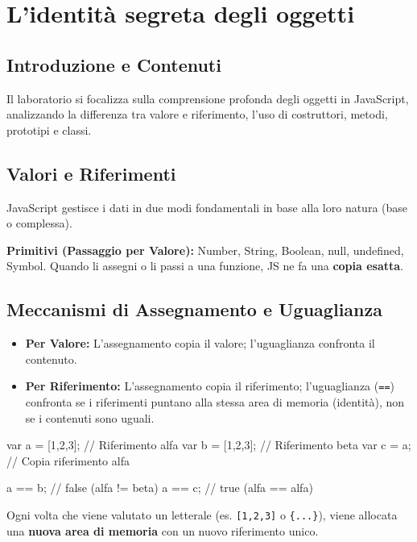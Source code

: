 \section{L'identità segreta degli oggetti}

\subsection{Introduzione e Contenuti}
Il laboratorio si focalizza sulla comprensione profonda degli oggetti in JavaScript, analizzando la differenza tra valore e riferimento, l'uso di costruttori, metodi, prototipi e classi.

\subsection{Valori e Riferimenti}
JavaScript gestisce i dati in due modi fondamentali in base alla loro natura (base o complessa).

\begin{definition}[title={Tipi di dato e Semantica}]
\textbf{Primitivi (Passaggio per Valore):} Number, String, Boolean, null, undefined, Symbol.
Quando li assegni o li passi a una funzione, JS ne fa una \textbf{copia esatta}.
\end{definition}

\subsection{Meccanismi di Assegnamento e Uguaglianza}
\begin{itemize}
    \item \textbf{Per Valore:} L'assegnamento copia il valore; l'uguaglianza confronta il contenuto.
    \item \textbf{Per Riferimento:} L'assegnamento copia il riferimento; l'uguaglianza (\texttt{==}) confronta se i riferimenti puntano alla stessa area di memoria (identità), non se i contenuti sono uguali.
\end{itemize}

\begin{jsbox}[title={Esempio Identità vs Uguaglianza}]
var a = [1,2,3]; // Riferimento alfa
var b = [1,2,3]; // Riferimento beta
var c = a;       // Copia riferimento alfa

a == b; // false (alfa != beta)
a == c; // true  (alfa == alfa)
\end{jsbox}

\begin{concept}[title={Allocazione di Memoria}]
Ogni volta che viene valutato un letterale (es. \texttt{[1,2,3]} o \texttt{\{...\}}), viene allocata una \textbf{nuova area di memoria} con un nuovo riferimento unico.
\end{concept}

